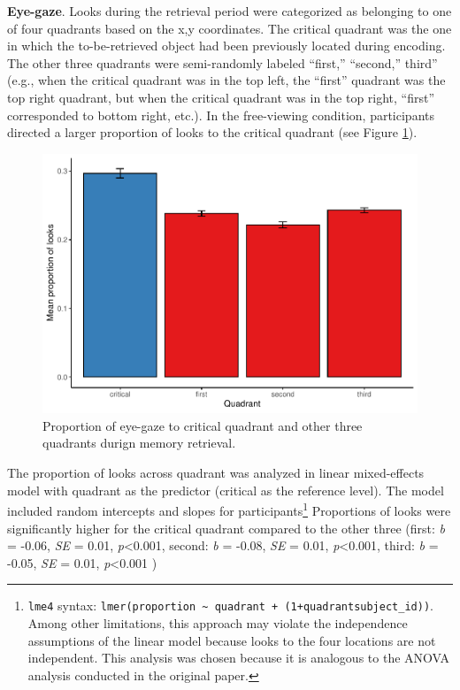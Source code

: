 \documentclass[
  english,
  man,floatsintext]{apa6}
\begin{document}
\textbf{Eye-gaze}. Looks during the retrieval period were categorized as belonging to one of four quadrants based on the x,y coordinates. The critical quadrant was the one in which the to-be-retrieved object had been previously located during encoding. The other three quadrants were semi-randomly labeled ``first,'' ``second,'' third'' (e.g., when the critical quadrant was in the top left, the ``first'' quadrant was the top right quadrant, but when the critical quadrant was in the top right, ``first'' corresponded to bottom right, etc.). In the free-viewing condition, participants directed a larger proportion of looks to the critical quadrant (see Figure \ref{fig:E2-gaze-fig}).

\begin{figure}
\centering
\includegraphics{manuscript_files/figure-latex/E2-gaze-fig-1.pdf}
\caption{\label{fig:E2-gaze-fig}Proportion of eye-gaze to critical quadrant and other three quadrants durign memory retrieval.}
\end{figure}

The proportion of looks across quadrant was analyzed in linear mixed-effects model with quadrant as the predictor (critical as the reference level). The model included random intercepts and slopes for participants\footnote{ \texttt{lme4} syntax: \texttt{lmer(proportion\ \textasciitilde{}\ quadrant\ +\ (1+quadrant\textbar{}subject\_id))}. Among other limitations, this approach may violate the independence assumptions of the linear model because looks to the four locations are not independent. This analysis was chosen because it is analogous to the ANOVA analysis conducted in the original paper.} Proportions of looks were significantly higher for the critical quadrant compared to the other three (first: \emph{b} = -0.06, \emph{SE} = 0.01, \emph{p}\textless0.001, second: \emph{b} = -0.08, \emph{SE} = 0.01, \emph{p}\textless0.001, third: \emph{b} = -0.05, \emph{SE} = 0.01, \emph{p}\textless0.001 )
\end{document}

